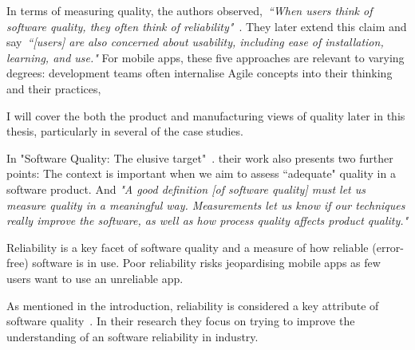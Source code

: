 In terms of measuring quality, the authors observed,~\emph{``When users think of software quality, they often think of reliability"}~\citep{kitchenham1996_software_quality_elusive_target}. They later extend this claim and say~\emph{``[users] are also concerned about usability, including ease of installation, learning, and use."}
%
For mobile apps, these five approaches are relevant to varying degrees: development teams often internalise Agile concepts into their thinking and their practices, %

I will cover the both the product and manufacturing views of quality later in this thesis, particularly in several of the case studies.



In "Software Quality: The elusive target"~\cite{kitchenham1996_software_quality_elusive_target}. their work also presents two further points: The context is important when we aim to assess ``adequate" quality in a software product. And \emph{"A good definition [of software quality] must let us measure quality in a meaningful way. Measurements let us know if our techniques really improve the software, as well as how process quality affects product quality."}


Reliability is a key facet of software quality and a measure of how reliable (error-free) software is in use. Poor reliability risks jeopardising mobile apps as few users want to use an unreliable app. 

As mentioned in the introduction, reliability is considered a key attribute of software quality~\citep{febrero2017_software_reliability_as_user_perception}. In their research they focus on trying to improve the understanding of an software reliability in industry. 

